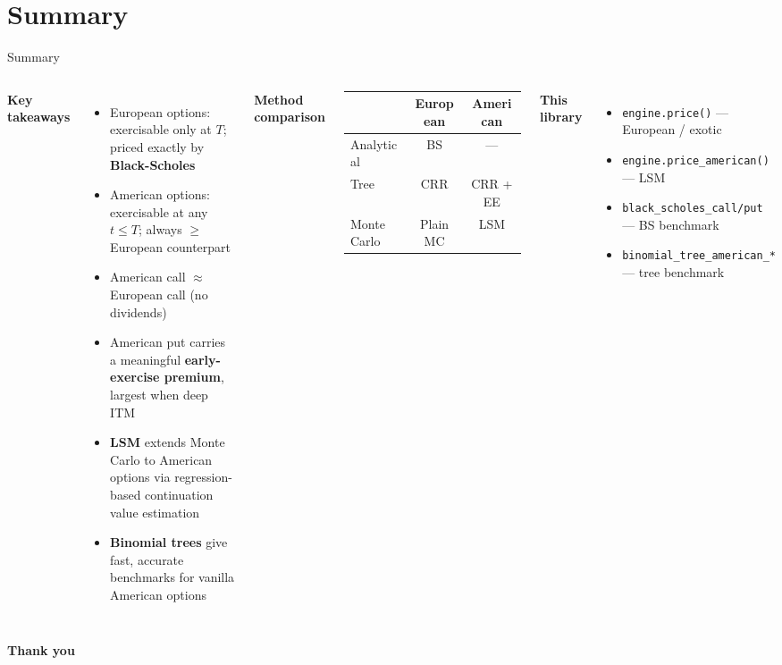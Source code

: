 \documentclass[aspectratio=169,10pt]{beamer}
\newcommand{\highlight}[1]{\textcolor{amred}{\textbf{#1}}}
\begin{document}
\section{Summary}

\begin{frame}{Summary}
  \begin{columns}[T]
      \textbf{Key takeaways}
      \begin{itemize}
        \item European options: exercisable only at $T$;
              priced exactly by \textbf{Black-Scholes}
        \item American options: exercisable at any $t \le T$;
              always $\ge$ European counterpart
        \item American call $\approx$ European call (no dividends)
        \item American put carries a meaningful
              \highlight{early-exercise premium}, largest when deep ITM
        \item \textbf{LSM} extends Monte Carlo to American options
              via regression-based continuation value estimation
        \item \textbf{Binomial trees} give fast, accurate benchmarks
              for vanilla American options
      \end{itemize}

      \textbf{Method comparison}

      \medskip
      \begin{tabular}{lcc}
        \toprule
        & European & American \\
        \midrule
        Analytical  & BS & --- \\
        Tree        & CRR & CRR + EE \\
        Monte Carlo & Plain MC & LSM \\
        \bottomrule
      \end{tabular}

      \bigskip
      \textbf{This library}
      \begin{itemize}
        \item \texttt{engine.price()} — European / exotic
        \item \texttt{engine.price\_american()} — LSM
        \item \texttt{black\_scholes\_call/put} — BS benchmark
        \item \texttt{binomial\_tree\_american\_*} — tree benchmark
      \end{itemize}
  \end{columns}
\end{frame}

\begin{frame}[plain]
  \begin{center}
    \Large\textbf{Thank you}
  \end{center}
\end{frame}
\end{document}

